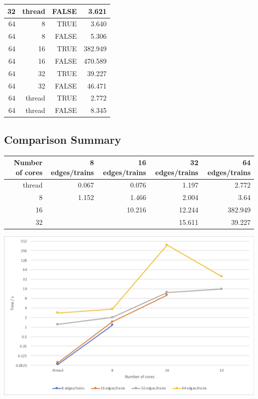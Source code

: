 \documentclass[a4paper,12pt]{article}
\begin{document}
\begin{center}
\begin{tabular}{r r r | r}
		32                      & thread         & FALSE & 3.621   \\
		\hline
		64                      & 8          & TRUE  & 3.640   \\
		64                      & 8          & FALSE & 5.306   \\
		64                      & 16         & TRUE  & 382.949 \\
		64                      & 16         & FALSE & 470.589 \\
		64                      & 32         & TRUE  & 39.227  \\
		64                      & 32         & FALSE & 46.471  \\
		64                      & thread         & TRUE  & 2.772   \\
		64                      & thread         & FALSE & 8.345   \\
	\end{tabular}
\end{center}

\subsection{Comparison Summary}
\begin{center}
	\begin{tabular}{r | r r r r}
		\textbf{Number of cores} & 8 edges/trains & 16 edges/trains & 32 edges/trains & 64 edges/trains \\ \hline
		thread                   & 0.067          & 0.076           & 1.197           & 2.772           \\ \hline
		8                        & 1.152          & 1.466           & 2.004           & 3.64            \\
		16                       &                & 10.216          & 12.244          & 382.949         \\
		32                       &                &                 & 15.611          & 39.227          \\
	\end{tabular}
\end{center}

\begin{center}
	\includegraphics[width=0.8\linewidth]{comparison-chart}
\end{center}
\end{document}
